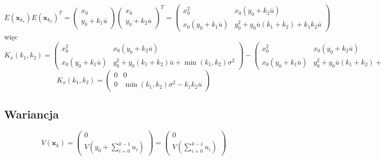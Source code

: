 \documentclass[10pt,a4paper]{article}
\begin{document}
\begin{equation}
E \left( \textbf{x}_{k_1} \right) E \left( \textbf{x}_{k_2} \right) ^T = 
\left(
\begin{matrix}
	x_0 \\ y_0 + k_1 \overline{u}
\end{matrix}
\right)
\left(
\begin{matrix}
	x_0 \\ y_0 + k_2 \overline{u}
\end{matrix}
\right)^T=
\left(
	\begin{matrix}
	x_0^2 & x_0 \left( y_0 + k_2 \overline{u} \right) \\
	x_0 \left( y_0+k_1 \overline{u} \right) &  y_0^2 + y_0 \overline{u} \left(k_1+k_2 \right) + k_1 k_2 \overline{u} 
	\end{matrix}
\right)
\end{equation}
więc 
\begin{equation}
K_x(k_1, k_2) = 
\left( 
		\begin{matrix}
			x_{0}^2 & x_0(y_{0} + k_2 \overline{u} ) \\
			x_0(y_{0} + k_1 \overline{u}) & y_0^2 + y_0(k_1+k_2) \overline{u}+\min( k_1, k_2 ) \sigma^2
		\end{matrix}			
	\right)
-
\left(
	\begin{matrix}
	x_0^2 & x_0 \left( y_0 + k_2 \overline{u} \right) \\
	x_0 \left( y_0+k_1 \overline{u} \right) &  y_0^2 + y_0 \overline{u} \left(k_1+k_2 \right) + k_1 k_2 \overline{u} 
	\end{matrix}
\right)
\end{equation}
\begin{equation}
K_x(k_1, k_2) = 
\left(
	\begin{matrix}
	0 & 0 \\
	0 & \min \left( k_1, k_2 \right) \sigma ^2 - k_1 k_2 \overline{u} 
	\end{matrix}
\right)
\end{equation}
\subsection*{Wariancja}
\begin{equation}
V \left( \textbf{x}_k \right) = 
\left(
	\begin{matrix}
	0 \\ V \left( y_0 + \sum \limits_{i=0}^{k-1} u_i \right)
	\end{matrix}
\right) = 
\left(
	\begin{matrix}
	0 \\ V \left(\sum \limits_{i=0}^{k-1} u_i \right)
	\end{matrix}
\right)
\end{equation}
\end{document}
